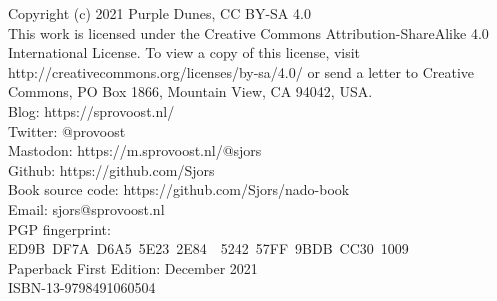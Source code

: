 Copyright (c) 2021 Purple Dunes, CC BY-SA 4.0\\

This work is licensed under the Creative Commons Attribution-ShareAlike 4.0 International License. To view a copy of this license, visit http://creativecommons.org/licenses/by-sa/4.0/ or send a letter to Creative Commons, PO Box 1866, Mountain View, CA 94042, USA.\\

Blog: https://sprovoost.nl/\\

Twitter: @provoost\\

Mastodon: https://m.sprovoost.nl/@sjors\\

Github: https://github.com/Sjors\\

Book source code: https://github.com/Sjors/nado-book\\

Email: sjors@sprovoost.nl\\

PGP fingerprint: ED9B DF7A D6A5 5E23 2E84  5242 57FF 9BDB CC30 1009\\

Paperback First Edition: December 2021\\

ISBN-13-9798491060504\\

\newpage
